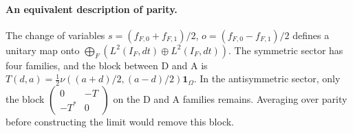 \paragraph{An equivalent description of parity.}
The change of variables $s=(f_{F,0}+f_{F,1})/2$, $o=(f_{F,0}-f_{F,1})/2$
defines a unitary map onto $\bigoplus_F(L^2(I_F,dt)\oplus L^2(I_F,dt))$.
The symmetric sector has four families, and the block between D and A is
$T(d,a)=\tfrac12\nu((a+d)/2,(a-d)/2)\mathbf1_\Omega$.
In the antisymmetric sector, only the block
$\left(\begin{smallmatrix}0&-T\\-T^*&0\end{smallmatrix}\right)$ on the D and A families remains.
Averaging over parity before constructing the limit would remove this block.
